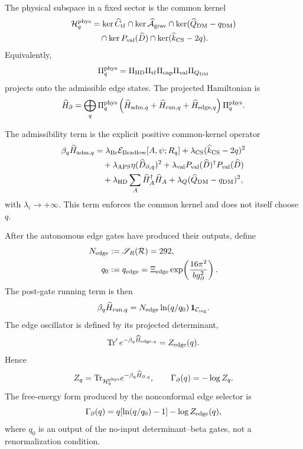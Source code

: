\documentclass[aps,prd,reprint,nofootinbib,superscriptaddress,floatfix]{revtex4-2}
\numberwithin{equation}{section}
\theoremstyle{definition}
\theoremstyle{plain}
\begin{document}
The physical subspace in a fixed sector is the common kernel
\[
\begin{aligned}
\mathcal H_q^{\rm phys}
&=
\ker\widehat C_{\rm tf}
\cap
\ker\widehat{\mathcal A}_{\rm grav}
\cap
\ker(\widehat Q_{\rm DM}-q_{\rm DM})\\
&\quad\cap
\ker P_{\rm val}(\widehat D)
\cap
\ker(\widehat k_{\rm CS}-2q).
\end{aligned}
\]
Equivalently,
\[
\Pi_q^{\rm phys}
=
\Pi_{\rm HD}\Pi_{\rm tf}\Pi_{\rm cap}\Pi_{\rm val}\Pi_{Q_{\rm DM}}
\]
projects onto the admissible edge states.  The projected Hamiltonian is
\[
\widehat H_\partial
=
\bigoplus_q
\Pi_q^{\rm phys}
\left(
\widehat H_{{\rm adm},q}
+
\widehat H_{{\rm run},q}
+
\widehat H_{{\rm edge},q}
\right)
\Pi_q^{\rm phys}.
\]

The admissibility term is the explicit positive common-kernel operator
\[
\begin{aligned}
\beta_q \widehat H_{{\rm adm},q}
&=
\lambda_{\rm Br}\mathcal E_{\rm Bradlow}[A,\psi;R_q]
+\lambda_{\rm CS}(\widehat k_{\rm CS}-2q)^2\\
&\quad
+\lambda_{\rm APS}\eta(\widehat D_{\partial,q})^2
+\lambda_{\rm val}P_{\rm val}(\widehat D)^\dagger
P_{\rm val}(\widehat D)\\
&\quad
+\lambda_{\rm HD}\sum_A\widehat H_A^\dagger\widehat H_A
+\lambda_Q(\widehat Q_{\rm DM}-q_{\rm DM})^2,
\end{aligned}
\]
with \(\lambda_i\to+\infty\).  This term enforces the common kernel and does
not itself choose \(q\).

After the autonomous edge gates have produced their outputs, define
\[
\begin{aligned}
N_{\rm edge}&:=\mathscr S_R(\mathcal R)=292,\\
q_0&:=q_{\rm edge}
=
\Xi_{\rm edge}
\exp\!\left(\frac{16\pi^2}{b g_\partial^2}\right).
\end{aligned}
\]
The post-gate running term is then
\[
\beta_q\widehat H_{{\rm run},q}
=
N_{\rm edge}\ln(q/q_0)\,\mathbf 1_{\mathcal C_{\rm reg}} .
\]
The edge oscillator is defined by its projected determinant,
\[
{\rm Tr}'\,e^{-\beta_q\widehat H_{{\rm edge},q}}
=
Z_{\rm edge}(q).
\]
Hence
\[
Z_q
=
{\rm Tr}_{\mathcal H_q^{\rm phys}}
e^{-\beta_q\widehat H_{\partial,q}},
\qquad
\Gamma_\partial(q)=-\log Z_q.
\]
The free-energy form produced by the nonconformal edge selector is
\[
\Gamma_\partial(q)
=
q[\ln(q/q_0)-1]-\log Z_{\rm edge}(q),
\]
where \(q_0\) is an output of the no-input determinant--beta gates, not a
renormalization condition.
\end{document}
